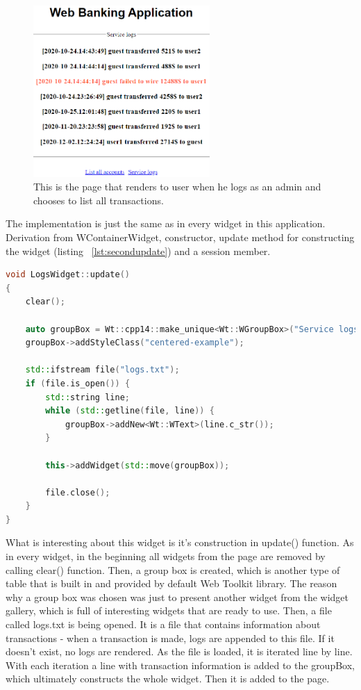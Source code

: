 \documentclass[a4paper,12pt]{book}
\begin{document}
{{\begin{figure}[H]
\centering
\includegraphics[width=0.6\textwidth]{servicelogs}
\caption{This is the page that renders to user when he logs as an admin and chooses to list all transactions.}
\label{fig:logslist}
\end{figure}

\bigskip
The implementation is just the same as in every widget in this application. Derivation from WContainerWidget, constructor, update method for constructing the widget (listing ~\ref{lst:secondupdate}) and a session member.

\bigskip
\begin{lstlisting}[frame=single, label={lst:secondupdate}, basicstyle=\small, language=C++, caption={LogsWidget::update() function.}, captionpos=b]
void LogsWidget::update()
{
	clear();

	auto groupBox = Wt::cpp14::make_unique<Wt::WGroupBox>("Service logs");
	groupBox->addStyleClass("centered-example");

	std::ifstream file("logs.txt");
	if (file.is_open()) {
		std::string line;
		while (std::getline(file, line)) {
			groupBox->addNew<Wt::WText>(line.c_str());
		}

		this->addWidget(std::move(groupBox));

		file.close();
	}
}
\end{lstlisting}

What is interesting about this widget is it's construction in update() function. As in every widget, in the beginning all widgets from the page are removed by calling clear() function. Then, a group box is created, which is  another type of table that is built in and provided by default Web Toolkit library. The reason why a group box was chosen was just to present another widget from the widget gallery, which is full of interesting widgets that are ready to use. Then, a file called logs.txt is being opened. It is a file that contains information about transactions - when a transaction is made, logs are appended to this file. If it doesn't exist, no logs are rendered. As the file is loaded, it is iterated line by line. With each iteration a line with transaction information is added to the groupBox, which ultimately constructs the whole widget. Then it is added to the page. 

}}
\end{document}

